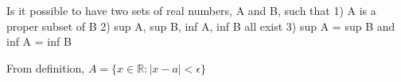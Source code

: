 \documentclass[boxes, qed]{homework}
\begin{document}
\newenvironment{amatrix}[1]{%
  \left[\begin{array}{@{}*{#1}{c}|c@{}}
}{%
  \end{array}\right]
}

\newenvironment{augmatrix}[1]{%
  \left[\begin{array}{#1}
}{%
  \end{array}\right]
}

\begin{problem}Is it possible to have two sets of real numbers, A and B, such that
  1) A is a proper subset of B
  2) sup A, sup B, inf A, inf B all exist
  3) sup A = sup B and inf A = inf B
\end{problem}
\begin{solution}From definition, $A=\{x\in{\mathbb{R}}:|x-a|<\epsilon\}$
\end{solution}
\end{document}
